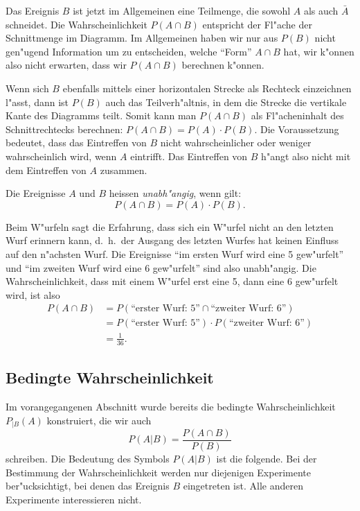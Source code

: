Das Ereignis $B$ ist jetzt im Allgemeinen eine Teilmenge, die sowohl $A$ 
als auch $\bar A$ schneidet.
Die Wahrscheinlichkeit $P(A \cap B)$ entspricht
der Fl"ache der Schnittmenge im Diagramm.
Im Allgemeinen haben wir
nur aus $P(B)$ nicht gen"ugend Information um zu entscheiden, welche
``Form'' $A\cap B$ hat, wir k"onnen also nicht erwarten, dass wir $P(A\cap B)$
berechnen k"onnen.

Wenn sich $B$ ebenfalls mittels einer horizontalen Strecke als Rechteck
einzeichnen l"asst, dann ist $P(B)$ auch das Teilverh"altnis, in dem
die Strecke die vertikale Kante des Diagramms teilt.
Somit kann man $P(A\cap B)$
als Fl"acheninhalt des Schnittrechtecks berechnen: $P(A\cap B)=P(A)\cdot P(B)$.
Die Voraussetzung bedeutet, dass das Eintreffen von $B$ nicht wahrscheinlicher
oder weniger
wahrscheinlich wird, wenn $A$ eintrifft.
Das Eintreffen von $B$ h"angt also
nicht mit dem Eintreffen von $A$ zusammen.

\begin{definition}
\label{def-unabhaengige-ereignisse}
Die Ereignisse $A$ und $B$ heissen {\em unabh"angig}, wenn gilt:
\[
P(A\cap B) = P(A)\cdot P(B).
\]
\end{definition}

Beim W"urfeln sagt die Erfahrung, dass sich ein W"urfel nicht an den
letzten Wurf erinnern kann, d.~h.~der Ausgang des letzten Wurfes hat
keinen Einfluss auf den n"achsten Wurf.
Die Ereignisse ``im ersten
Wurf wird eine 5 gew"urfelt'' und ``im zweiten Wurf wird eine 6 gew"urfelt''
sind also unabh"angig.
Die Wahrscheinlichkeit, dass mit einem W"urfel
erst eine 5, dann eine 6 gew"urfelt wird, ist also
\begin{align*}
P(A\cap B)&=P(\text{``erster Wurf: 5''}\cap\text{``zweiter Wurf: 6''})\\
&=P(\text{``erster Wurf: 5''})\cdot P(\text{``zweiter Wurf: 6''})\\
&=\frac1{36}.
\end{align*}

\subsection{Bedingte Wahrscheinlichkeit}
Im vorangegangenen Abschnitt wurde bereits die bedingte Wahrscheinlichkeit
$P_{|B}(A)$ konstruiert, die wir auch
\[
P(A|B)=\frac{P(A\cap B)}{P(B)}
\]
schreiben.
Die Bedeutung des Symbols $P(A|B)$ ist die folgende.
Bei der
Bestimmung der Wahrscheinlichkeit werden nur diejenigen Experimente
ber"ucksichtigt, bei denen das Ereignis $B$ eingetreten ist.
Alle anderen Experimente interessieren nicht.

